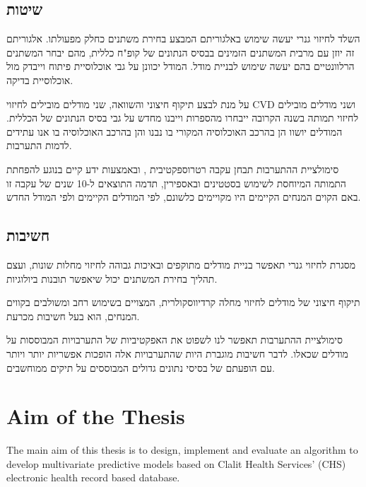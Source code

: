 \documentclass[a4paper,12pt]{article}
\begin{document}
\begin{hebrew}
		\subsection*{שיטות}
			השלד לחיזוי גנרי יעשה שימוש באלגוריתם המבצע בחירת משתנים כחלק מפעולתו. אלגוריתם זה יוזן עם מרבית המשתנים הזמינים בבסיס הנתונים של קופ"ח כללית, מהם יבחר המשתנים הרלוונטיים בהם יעשה שימוש לבניית מודל. המודל יכוונן על גבי אוכלוסיית פיתוח וייבדק מול אוכלוסיית בדיקה.
			
			על מנת לבצע תיקוף חיצוני והשוואה, שני מודלים מובילים לחיזוי CVD ושני מודלים מובילים לחיזוי תמותה בשנה הקרובה ייבחרו מהספרות וייבנו מחדש על גבי בסיס הנתונים של הכללית. המודלים יושוו הן בהרכב האוכלוסיה המקורי בו נבנו והן בהרכב האוכלוסיה בו אנו עתידים לדמות התערבות.
			
			סימולציית ההתערבות תבחן עקבה רטרוספקטיבית , ובאמצעות ידע קיים בנוגע להפחתת התמותה המיוחסת לשימוש בסטטינים ובאספירין, תדמה התוצאים ל-10 שנים  של עקבה זו  באם הקוים המנחים הקיימים היו מקויימים כלשונם, לפי המודלים הקיימים ולפי המודל החדש.
			
		\subsection*{חשיבות}
			מסגרת לחיזוי גנרי תאפשר בניית מודלים מתוקפים ובאיכות גבוהה לחיזוי מחלות שונות, ועצם תהליך בחירת המשתנים יכול שיאפשר תובנות ביולוגיות.

			תיקוף חיצוני של מודלים לחיזוי מחלה קרדיווסקולרית, המצויים בשימוש רחב ומשולבים בקווים המנחים, הוא בעל חשיבות מכרעת\cite{Collins2015}.
			
			סימולציית ההתערבות תאפשר לנו לשפוט את האפקטיביות של התערבויות המבוססות על מודלים שכאלו. לדבר חשיבות מוגברת היות שהתערבויות אלה הופכות אפשריות יותר ויותר עם הופעתם של בסיסי נתונים גדולים המבוססים על תיקים ממוחשבים.
		
	\end{hebrew}
	
	\section{Aim of the Thesis}
	The main aim of this thesis is to design, implement and evaluate an algorithm to develop multivariate predictive models based on Clalit Health Services' (CHS) electronic health record based database.
	
\end{document}
